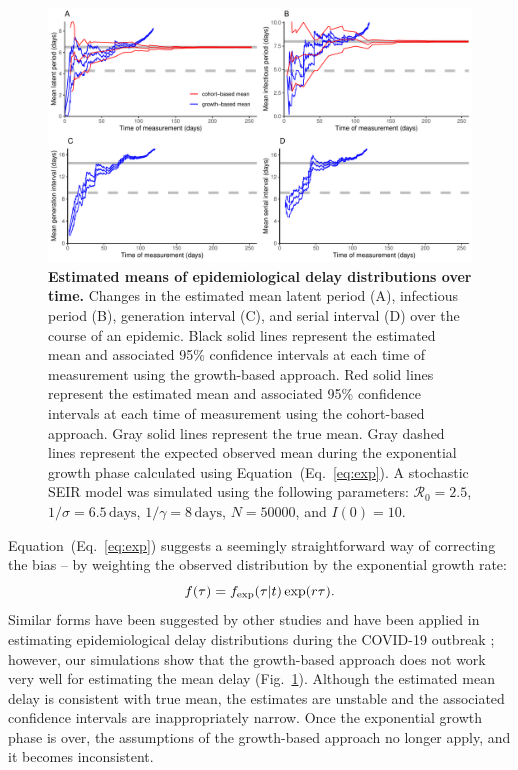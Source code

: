 \documentclass[12pt]{article}
\newcommand{\eref}[1]{(Eq.~\ref{eq:#1})}
\newcommand{\fref}[1]{Fig.~\ref{fig:#1}}
\begin{document}
\begin{figure}[!th]
\includegraphics[width=\textwidth]{figure_seir2.pdf}
\caption{
\textbf{Estimated means of epidemiological delay distributions over time.}
Changes in the estimated mean latent period (A), infectious period (B), generation interval (C), and serial interval (D) over the course of an epidemic.
Black solid lines represent the estimated mean and associated 95\% confidence intervals at each time of measurement using the growth-based approach.
Red solid lines represent the estimated mean and associated 95\% confidence intervals at each time of measurement using the cohort-based approach.
Gray solid lines represent the true mean.
Gray dashed lines represent the expected observed mean during the exponential growth phase calculated using Equation~\eref{exp}.
A stochastic SEIR model was simulated using the following parameters: $\mathcal R_0 = 2.5$, $1/\sigma = 6.5\,\textrm{days}$, $1/\gamma = 8\,\textrm{days}$, $N=50000$, and $I(0)=10$.
}
\label{fig:seir2}
\end{figure}

Equation~\eref{exp} suggests a seemingly straightforward way of correcting the bias -- by weighting the observed distribution by the exponential growth rate:
\begin{equation}
\label{eq:exp}
f(\tau) = f_{\tiny\textrm{exp}}(\tau|t) \exp(r \tau).
\end{equation}
Similar forms have been suggested by other studies \citep{britton2019estimation, park2019inferring} and have been applied in estimating epidemiological delay distributions during the COVID-19 outbreak \citep{nishiura2020serial, linton2020incubation};
however, our simulations show that the growth-based approach does not work very well for estimating the mean delay (\fref{seir2}).
Although the estimated mean delay is consistent with true mean, the estimates are unstable and the associated confidence intervals are inappropriately narrow.
Once the exponential growth phase is over, the assumptions of the growth-based approach no longer apply, and it becomes inconsistent.
\end{document}
